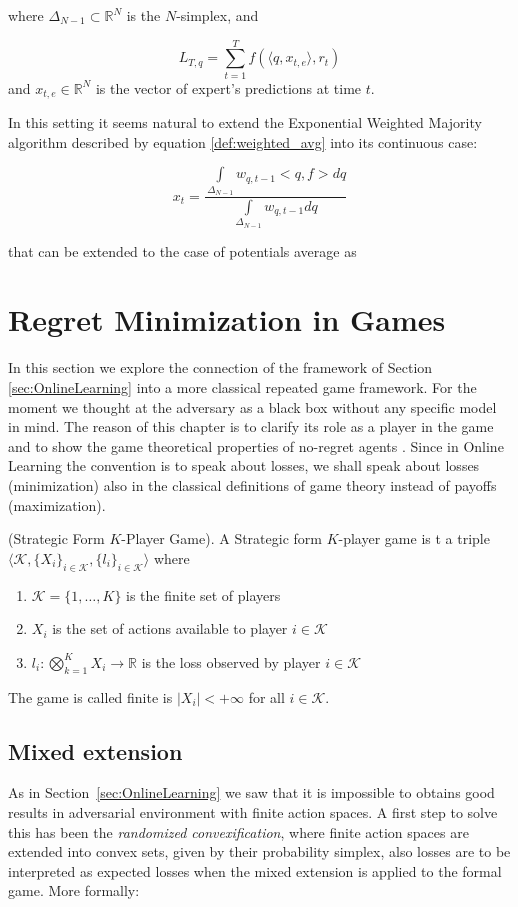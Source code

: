 where $\Delta_{N-1}\subset \mathbb R^{N}$ is the $N$-simplex, and 

$$L_{T,q}=\sum\limits_{t=1}^T f(\langle q,x_{t,e}\rangle,r_t)$$
and $x_{t,e}\in\mathbb R^N$ is the vector of expert's predictions at time $t$.

In this setting it seems natural to extend the Exponential Weighted Majority algorithm described by equation \eqref{def:weighted_avg} into its continuous case:

$$x_t=\frac{\int\limits_{\Delta_{N-1}} w_{q,t-1}<q,f>dq}{\int\limits_{\Delta_{N-1}} w_{q,t-1}dq}$$

that can be extended to the case of potentials average as 

\section{Regret Minimization in Games}
\label{sec:GT}
In this section we explore the connection of the framework of Section \ref{sec:OnlineLearning} into a more classical repeated game framework. For the moment we thought at the adversary as a black box without any specific model in mind. The reason of this chapter is to clarify its role as a player in the game and to show the game theoretical properties of no-regret agents . Since in Online Learning the convention is to speak about losses, we shall speak about losses (minimization) also in the classical definitions of game theory instead of payoffs (maximization).

\begin{definition}(Strategic Form $K$-Player Game).\label{def:Game}
    A Strategic form $K$-player game is t a triple $\langle\mathcal K,\{X_i\}_{i\in\mathcal K},\{l_i\}_{i\in\mathcal K}\rangle$ where
    \begin{enumerate}
        \item $\mathcal K=\{1,\ldots,K\}$ is the finite set of players
        \item $X_i$ is the set of actions available to player $i\in\mathcal K$
        \item $l_i:\bigotimes\limits_{k=1}^KX_i\to\mathbb R$ is the loss observed by player $i\in\mathcal K$
    \end{enumerate}
	The game is called finite is $|X_i|<+\infty$ for all $i\in\mathcal K$.
\end{definition}


\subsection{Mixed extension}\label{sec:mixed}
As in Section~\ref{sec:OnlineLearning} we saw that it is impossible to obtains good results   in adversarial environment with finite action spaces. A first step to solve this has been the \emph{randomized convexification}, where finite action spaces are extended into convex sets, given by their probability simplex, also losses are to be interpreted as expected losses when the mixed extension is applied to the formal game. More formally: 

